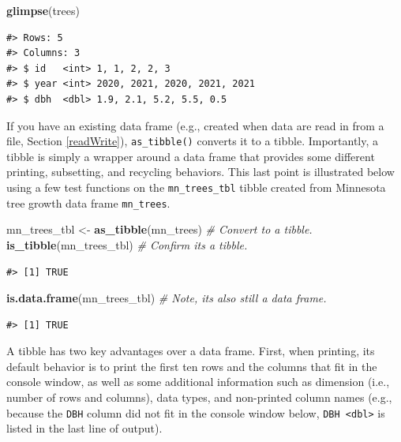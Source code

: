 \documentclass[
  11pt,
]{krantz}
\newenvironment{Shaded}{\begin{snugshade}}{\end{snugshade}}
\newcommand{\CommentTok}[1]{\textcolor[rgb]{0.56,0.35,0.01}{\textit{#1}}}
\newcommand{\KeywordTok}[1]{\textcolor[rgb]{0.13,0.29,0.53}{\textbf{#1}}}
\newcommand{\NormalTok}[1]{#1}
\newcommand{\StringTok}[1]{\textcolor[rgb]{0.31,0.60,0.02}{#1}}
\theoremstyle{definition}
\theoremstyle{definition}
\theoremstyle{definition}
\theoremstyle{definition}
\theoremstyle{remark}
\begin{document}
\begin{Shaded}
\begin{Highlighting}[]
\KeywordTok{glimpse}\NormalTok{(trees)}
\end{Highlighting}
\end{Shaded}

\begin{verbatim}
#> Rows: 5
#> Columns: 3
#> $ id   <int> 1, 1, 2, 2, 3
#> $ year <int> 2020, 2021, 2020, 2021, 2021
#> $ dbh  <dbl> 1.9, 2.1, 5.2, 5.5, 0.5
\end{verbatim}

If you have an existing data frame (e.g., created when data are read in from a file, Section \ref{readWrite}), \texttt{as\_tibble()} converts it to a tibble. Importantly, a tibble is simply a wrapper around a data frame that provides some different printing, subsetting, and recycling behaviors. This last point is illustrated below using a few test functions on the \texttt{mn\_trees\_tbl} tibble created from Minnesota tree growth data frame \texttt{mn\_trees}.

\begin{Shaded}
\begin{Highlighting}[]
\NormalTok{mn\_trees\_tbl \textless{}{-}}\StringTok{ }\KeywordTok{as\_tibble}\NormalTok{(mn\_trees) }\CommentTok{\# Convert to a tibble.}
\KeywordTok{is\_tibble}\NormalTok{(mn\_trees\_tbl) }\CommentTok{\# Confirm it\textquotesingle{}s a tibble.}
\end{Highlighting}
\end{Shaded}

\begin{verbatim}
#> [1] TRUE
\end{verbatim}

\begin{Shaded}
\begin{Highlighting}[]
\KeywordTok{is.data.frame}\NormalTok{(mn\_trees\_tbl) }\CommentTok{\# Note, it\textquotesingle{}s also still a data frame.}
\end{Highlighting}
\end{Shaded}

\begin{verbatim}
#> [1] TRUE
\end{verbatim}

A tibble has two key advantages over a data frame. First, when printing, its default behavior is to print the first ten rows and the columns that fit in the console window, as well as some additional information such as dimension (i.e., number of rows and columns), data types, and non-printed column names (e.g., because the \texttt{DBH} column did not fit in the console window below, \texttt{DBH\ \textless{}dbl\textgreater{}} is listed in the last line of output).
\end{document}
